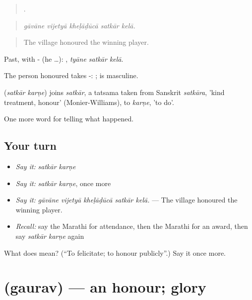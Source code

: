 \begin{quote}
    .
\end{quote}

\begin{quote}
\emph{gāvāne vijetyā kheḷāḍūcā satkār kelā.}
\end{quote}

\begin{quote}
The village honoured the winning player.
\end{quote}

Past, with - (he …):   , \emph{tyāne satkār kelā}.

The person honoured takes -:   ;  is masculine.

\begin{cousinweb}
\textbf{ } (\emph{satkār karṇe}) joins \emph{satkār}, a tatsama taken from Sanskrit \emph{satkāra}, 'kind treatment, honour' (Monier-Williams), to \emph{karṇe}, 'to do'.
\end{cousinweb}

\begin{grammarlens}[title={What you've built}]
One more word for telling what happened.
\end{grammarlens}

\subsection*{Your turn}
\begin{itemize}
\raggedright
  \item \emph{Say it:} \emph{satkār karṇe}
  \item \emph{Say it:} \emph{satkār karṇe}, once more
  \item \emph{Say it:} \emph{gāvāne vijetyā kheḷāḍūcā satkār kelā.} — The village honoured the winning player.
  \item \emph{Recall:} say the Marathi for attendance, then the Marathi for an award, then say \emph{satkār karṇe} again
\end{itemize}

\begin{tcolorbox}[breakable,colback=teal!4,colframe=teal!35!black,title={Before you move on}]
What does   mean? (\textquotedblleft{}To felicitate; to honour publicly\textquotedblright{}.) Say it once more.
\end{tcolorbox}
\section[\texorpdfstring{\mr{गौरव} (gaurav)}{गौरव (gaurav)}]{ (gaurav) — an honour; glory}

